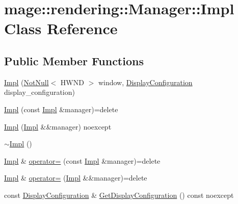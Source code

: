 \hypertarget{classmage_1_1rendering_1_1_manager_1_1_impl}{}\section{mage\+:\+:rendering\+:\+:Manager\+:\+:Impl Class Reference}
\label{classmage_1_1rendering_1_1_manager_1_1_impl}
\subsection*{Public Member Functions}
\begin{DoxyCompactItemize}
\item 
\mbox{\hyperlink{classmage_1_1rendering_1_1_manager_1_1_impl_aaed30d537e5fd07c2f6a9ac0382c9238}{Impl}} (\mbox{\hyperlink{namespacemage_a8769f9d670d6b585ea306cb1062af94b}{Not\+Null}}$<$ H\+W\+ND $>$ window, \mbox{\hyperlink{classmage_1_1rendering_1_1_display_configuration}{Display\+Configuration}} display\+\_\+configuration)
\item 
\mbox{\hyperlink{classmage_1_1rendering_1_1_manager_1_1_impl_a73004bf6e59f4fb38257e4ca30bca8a0}{Impl}} (const \mbox{\hyperlink{classmage_1_1rendering_1_1_manager_1_1_impl}{Impl}} \&manager)=delete
\item 
\mbox{\hyperlink{classmage_1_1rendering_1_1_manager_1_1_impl_af9164e13dda6ab8b553e58c62ca79378}{Impl}} (\mbox{\hyperlink{classmage_1_1rendering_1_1_manager_1_1_impl}{Impl}} \&\&manager) noexcept
\item 
\mbox{\hyperlink{classmage_1_1rendering_1_1_manager_1_1_impl_a34e0d4635b02ea40cc01847d0e1a4fb7}{$\sim$\+Impl}} ()
\item 
\mbox{\hyperlink{classmage_1_1rendering_1_1_manager_1_1_impl}{Impl}} \& \mbox{\hyperlink{classmage_1_1rendering_1_1_manager_1_1_impl_a2367cc9262863faeed5166bd53ba52c0}{operator=}} (const \mbox{\hyperlink{classmage_1_1rendering_1_1_manager_1_1_impl}{Impl}} \&manager)=delete
\item 
\mbox{\hyperlink{classmage_1_1rendering_1_1_manager_1_1_impl}{Impl}} \& \mbox{\hyperlink{classmage_1_1rendering_1_1_manager_1_1_impl_a3dfc877c5737abc5020cf700dec8eb60}{operator=}} (\mbox{\hyperlink{classmage_1_1rendering_1_1_manager_1_1_impl}{Impl}} \&\&manager)=delete
\item 
const \mbox{\hyperlink{classmage_1_1rendering_1_1_display_configuration}{Display\+Configuration}} \& \mbox{\hyperlink{classmage_1_1rendering_1_1_manager_1_1_impl_a413668c5240857bf38197fc8a700ceab}{Get\+Display\+Configuration}} () const noexcept

\end{DoxyCompactItemize}
